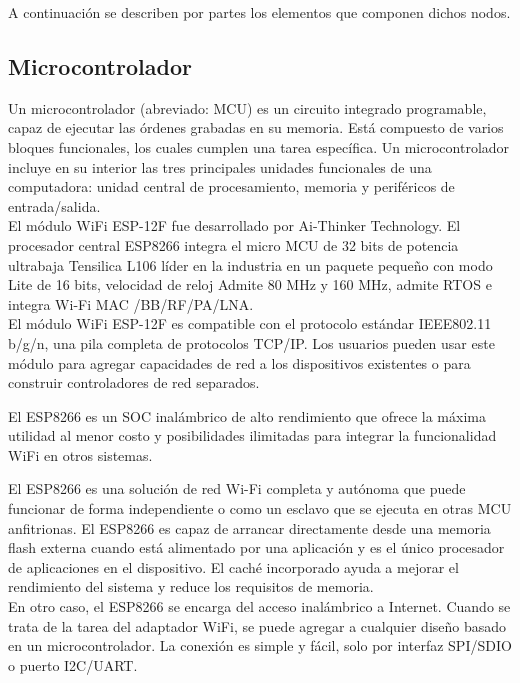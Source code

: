 A continuación se describen por partes los elementos que componen dichos nodos.


\subsection{Microcontrolador} \label{sec: microcontrolador}

    Un microcontrolador (abreviado: MCU) es un circuito integrado programable, capaz de ejecutar las órdenes grabadas en su memoria. Está compuesto de varios bloques funcionales, los cuales cumplen una tarea específica. Un microcontrolador incluye en su interior las tres principales unidades funcionales de una computadora: unidad central de procesamiento, memoria y periféricos de entrada/salida.\\

    El módulo WiFi ESP-12F fue desarrollado por Ai-Thinker Technology. El procesador central ESP8266 integra el micro MCU de 32 bits de potencia ultrabaja Tensilica L106 líder en la industria en un paquete pequeño con modo Lite de 16 bits, velocidad de reloj Admite 80 MHz y 160 MHz, admite RTOS e integra Wi-Fi MAC /BB/RF/PA/LNA.\\

    El módulo WiFi ESP-12F es compatible con el protocolo estándar IEEE802.11 b/g/n, una pila completa de protocolos TCP/IP. Los usuarios pueden usar este módulo para agregar capacidades de red a los dispositivos existentes o para construir controladores de red separados.

    El ESP8266 es un SOC inalámbrico de alto rendimiento que ofrece la máxima utilidad al menor costo y posibilidades ilimitadas para integrar la funcionalidad WiFi en otros sistemas.
    
    El ESP8266 es una solución de red Wi-Fi completa y autónoma que puede funcionar de forma independiente o como un esclavo que se ejecuta en otras MCU anfitrionas. El ESP8266 es capaz de arrancar directamente desde una memoria flash externa cuando está alimentado por una aplicación y es el único procesador de aplicaciones en el dispositivo. El caché incorporado ayuda a mejorar el rendimiento del sistema y reduce los requisitos de memoria.\\

    En otro caso, el ESP8266 se encarga del acceso inalámbrico a Internet. Cuando se trata de la tarea del adaptador WiFi, se puede agregar a cualquier diseño basado en un microcontrolador. La conexión es simple y fácil, solo por interfaz SPI/SDIO o puerto I2C/UART.

